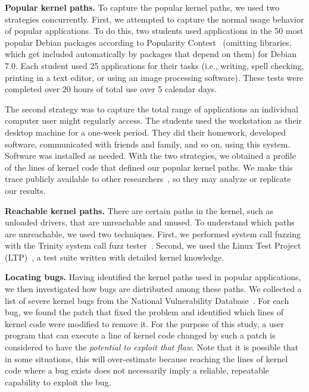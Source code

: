 \textbf{Popular kernel paths.}
To capture the popular kernel paths, we used two strategies concurrently.
First, we attempted to capture the normal usage behavior of popular applications.
To do this, two students used applications in the 50 most popular Debian
packages according to Popularity Contest~\cite{Top-Packages} (omitting 
libraries, which get included automatically by packages that depend on them) 
for Debian 7.0. %
Each student used 25 applications for their 
tasks (i.e., writing, spell checking, printing in a text editor, or using
an image processing software). 
These tests were completed over 20 hours of
total use over 5 calendar days.

The second strategy was to capture the total range of applications an
individual computer user might regularly access. The students used the workstation as their
desktop machine for a one-week period. They did their homework, developed
software, communicated with friends and family, and so on, using this 
system.  Software was installed as needed.
%
With the two strategies, we obtained a profile of the lines of
kernel code that defined our popular kernel paths.  We make this trace 
publicly available to other researchers~\cite{Lind}, so they may analyze or
replicate our results.

\textbf{Reachable kernel paths.}
There are certain paths in the kernel, such as unloaded drivers, that are
unreachable and unused.
To understand which paths are unreachable, we used two techniques.  First,
we performed system call fuzzing with the Trinity
system call fuzz tester~\cite{Trinity}.
Second, we used the Linux Test Project (LTP)~\cite{LTP}, a test suite written
with detailed kernel knowledge.
%

\textbf{Locating bugs.}
Having identified the kernel paths used in popular applications,
we then investigated how bugs are distributed among these paths. We collected a list of
severe kernel bugs from the National Vulnerability Database~\cite{NVD}.
For each bug, we found the patch that fixed the problem and identified
which lines of kernel code were modified to remove it.
For the purpose of this study, a user program that can execute a line of kernel
code changed by such a patch is considered to have the \textit{potential to
exploit that flaw}.  Note that it is possible that in some situations, 
this will over-estimate because reaching the lines of kernel code where a 
bug exists does not necessarily imply a reliable, repeatable capability to
exploit the bug.

